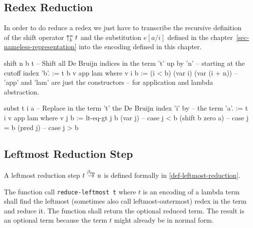 \documentclass[12pt]{article}
\begin{document}
\subsection{Redex Reduction}


In order to do reduce a redex we just have to transcribe the
recursive definition of the shift operator $\uparrow^n_b t$ and the substitution
$e[a/i]$ defined in the chapter~\ref{sec-nameless-representation} into the
encoding defined in this chapter.

\begin{lam}
    shift n b t
        -- Shift all De Bruijn indices in the term 't' up by 'n'
        -- starting at the cutoff index 'b'.
    :=
        t b v app lam where
            v i b := (i < b) (var i) (var (i + n))
            -- 'app' and 'lam' are just the constructors
            -- for application and lambda abstraction.
\end{lam}

\begin{lam}
    subst t i a
        -- Replace in the term 't' the De Bruijn index 'i' by
        -- the term 'a'.
    :=
        t i v app lam where
            v j b :=
                lt-eq-gt j b
                    (var j)             -- case j < b
                    (shift b zero a)    -- case j = b
                    (pred j)            -- case j > b
\end{lam}











\subsection{Leftmost Reduction Step}
\label{sec-leftmost-reduction-step}

A leftmost reduction step $t \stackrel{\beta_{\text{lm}}}\to u$ is defined formally in
\ref{def-leftmost-reduction}.

The function call {\tt reduce-leftmost t} where $t$ is an encoding of a
lambda term shall find the leftmost (sometimes also call leftmost-outermost)
redex in the term and reduce it. The function shall return the optional reduced
term. The result is an optional term because the term $t$ might already be in
normal form.
\end{document}
